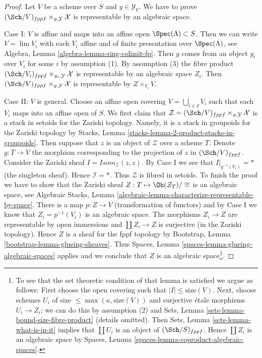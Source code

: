 \begin{proof}
Let $V$ be a scheme over $S$ and $y \in \mathcal{Y}_V$. We have to prove
$(\Sch/V)_{fppf} \times_{y, \mathcal{Y}} \mathcal{X}$ is representable
by an algebraic space.

\medskip\noindent
Case I: $V$ is affine and maps into an affine open $\Spec(\Lambda) \subset S$.
Then we can write $V = \lim V_i$ with each $V_i$ affine and of finite
presentation over $\Spec(\Lambda)$, see
Algebra, Lemma \ref{algebra-lemma-ring-colimit-fp}.
Then $y$ comes from an object $y_i$ over $V_i$ for some $i$ by assumption (1).
By assumption (3) the fibre product
$(\Sch/V_i)_{fppf} \times_{y_i, \mathcal{Y}} \mathcal{X}$ is representable
by an algebraic space $Z_i$. Then
$(\Sch/V)_{fppf} \times_{y, \mathcal{Y}} \mathcal{X}$ is representable
by $Z \times_{V_i} V$.

\medskip\noindent
Case II: $V$ is general. Choose an affine open covering
$V = \bigcup_{i \in I} V_i$ such that each $V_i$ maps into an affine open
of $S$. We first claim
that $\mathcal{Z} = (\Sch/V)_{fppf} \times_{y, \mathcal{Y}} \mathcal{X}$
is a stack in setoids for the Zariski topology. Namely, it is a stack in
groupoids for the Zariski topology by
Stacks, Lemma \ref{stacks-lemma-2-product-stacks-in-groupoids}.
Then suppose that $z$ is an object of $\mathcal{Z}$ over a scheme $T$.
Denote $g : T \to V$ the morphism corresponding to the
projection of $z$ in $(\Sch/V)_{fppf}$. Consider the Zariski sheaf
$\mathit{I} = \mathit{Isom}_{\mathcal{Z}}(z, z)$. By Case I we see that
$\mathit{I}|_{g^{-1}(V_i)} = *$ (the singleton sheaf). Hence
$\mathcal{I} = *$. Thus $\mathcal{Z}$ is fibred in setoids. To finish
the proof we have to show that the Zariski sheaf
$Z : T \mapsto \Ob(\mathcal{Z}_T)/\cong$ is an algebraic space, see
Algebraic Stacks, Lemma
\ref{algebraic-lemma-characterize-representable-by-space}.
There is a map $p : Z \to V$ (transformation of functors) and by Case I
we know that $Z_i = p^{-1}(V_i)$ is an algebraic space. The morphisms
$Z_i \to Z$ are representable by open immersions and
$\coprod Z_i \to Z$ is surjective (in the Zariski topology).
Hence $Z$ is a sheaf for the fppf topology by
Bootstrap, Lemma \ref{bootstrap-lemma-glueing-sheaves}.
Thus Spaces, Lemma \ref{spaces-lemma-glueing-algebraic-spaces}
applies and we conclude that $Z$ is an algebraic space\footnote{
To see that the set theoretic condition of that lemma is satisfied
we argue as follows: First choose the open covering such that
$|I| \leq \text{size}(V)$. Next, choose schemes $U_i$ of size
$\leq \max(\kappa, \text{size}(V))$ and surjective \'etale morphisms
$U_i \to Z_i$; we can do this by assumption (2) and
Sets, Lemma \ref{sets-lemma-bound-size-fibre-product}
(details omitted). Then
Sets, Lemma \ref{sets-lemma-what-is-in-it}
implies that $\coprod U_i$ is an object of $(\Sch/S)_{fppf}$.
Hence $\coprod Z_i$ is an algebraic space by
Spaces, Lemma \ref{spaces-lemma-coproduct-algebraic-spaces}.
}.
\end{proof}

